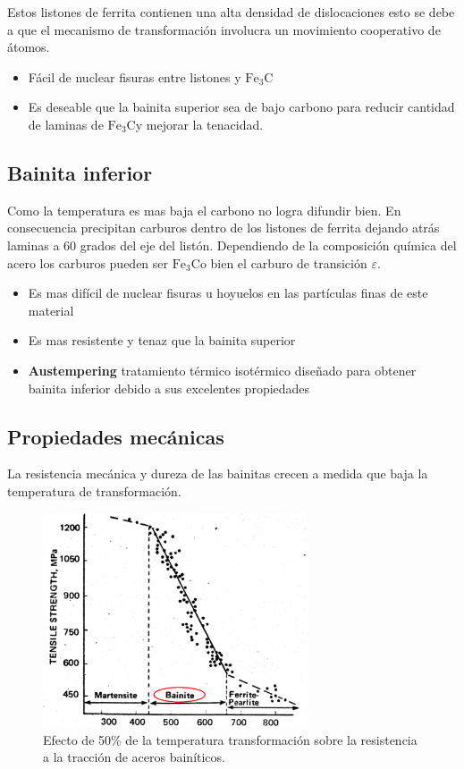 \documentclass{article}
\newcommand{\cementita}{\ensuremath{\mathrm{Fe}_3 \mathrm{C}}}
\begin{document}
Estos listones de ferrita contienen una alta densidad de dislocaciones esto se debe a que el mecanismo de transformación involucra un movimiento cooperativo de átomos.
\begin{itemize}
    \item Fácil de nuclear fisuras entre listones y \cementita
    \item Es deseable que la bainita superior sea de bajo carbono para reducir cantidad de laminas de \cementita y mejorar la tenacidad.
\end{itemize}



\subsection{Bainita inferior}
Como la temperatura es mas baja el carbono no logra difundir bien. En consecuencia precipitan carburos dentro de los listones de ferrita dejando atrás laminas a 60 grados del eje del listón. Dependiendo de la composición química del acero los carburos pueden ser \cementita o bien el carburo de transición $\varepsilon$.
\begin{itemize}
    \item Es mas difícil de nuclear fisuras u hoyuelos en las partículas finas de este material
    \item Es mas resistente y tenaz que la bainita superior
    \item \textbf{Austempering} tratamiento térmico isotérmico diseñado para obtener bainita inferior debido a sus excelentes propiedades 
\end{itemize}


\subsection{Propiedades mecánicas}
La resistencia mecánica y dureza de las bainitas crecen a medida que baja la temperatura de transformación.

\begin{figure}[htb!]
    \centering
    \includegraphics[width=0.7\textwidth]{fig/RmVsBainitaMartensita.PNG}
    \caption{Efecto de 50\% de la temperatura transformación sobre la resistencia a la tracción de aceros bainíticos.}
    \label{fig:RmVsBainitaMartensita}
\end{figure}
\end{document}
